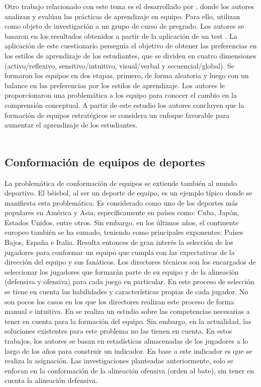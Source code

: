 Otro trabajo relacionado con este tema es el desarrollado por \cite{Kittur2020}, donde los autores analizan y evalúan las prácticas de aprendizaje en equipo. Para ello, utilizan como objeto de investigación a un grupo de curso de pregrado. Los autores se basaron en los resultados obtenidos a partir de la aplicación de un test \cite{Felder}. La aplicación de este cuestionario perseguía el objetivo de obtener las preferencias en los estilos de aprendizaje de los estudiantes, que se dividen en cuatro dimensiones (activo/reflexivo, sensitivo/intuitivo, visual/verbal y secuencial/global). Se formaron los equipos en dos etapas, primero, de forma aleatoria y luego con un balance en las preferencias por los estilos de aprendizaje. Los autores le proporcionaron una problemática a los equipo para conocer el cambio en la comprensión conceptual. A partir de este estudio los autores concluyen que la formación de equipos estratégicos se considera un enfoque favorable para aumentar el aprendizaje de los estudiantes. \\\\


\subsection{Conformación de equipos de deportes}

La problemática de conformación de equipos se extiende también al mundo deportivo. El béisbol, al ser un deporte de equipo, es un ejemplo típico donde se manifiesta esta problemática. Es considerado como uno de los deportes más populares en América y Asia, específicamente en países como: Cuba, Japón, Estados Unidos, entre otros. Sin embargo, en los últimos años, el continente europeo también se ha sumado, teniendo como principales exponentes: Países Bajos, España e Italia. Resulta entonces de gran interés la selección de los jugadores para conformar un equipo que cumpla con las expectativas de la dirección del equipo y sus fanáticos. Los directores técnicos son los encargados de seleccionar los jugadores que formarán parte de su equipo y de la alineación (defensiva y ofensiva) para cada juego en particular. En este proceso de selección se tiene en cuenta las habilidades y características propias de cada jugador. No son pocos los casos en los que los directores realizan este proceso de forma manual e intuitiva. En \cite{Smith1995} se realiza un estudio sobre las competencias necesarias a tener en cuenta para la formación del equipo. Sin embargo, en la actualidad, las soluciones existentes para este problema \citep{Polyashuk2015, Sugrue2007} no las tienen en cuenta. En estos trabajos, los autores se basan en estadísticas almacenadas de los jugadores a lo largo de los años para construir un indicador. En base a este indicador es que se realiza la asignación. Las investigaciones planteadas anteriormente, solo se enfocan en la conformación de la alineación ofensiva (orden al bate), sin tener en cuenta la alineación defensiva.  \\\\


